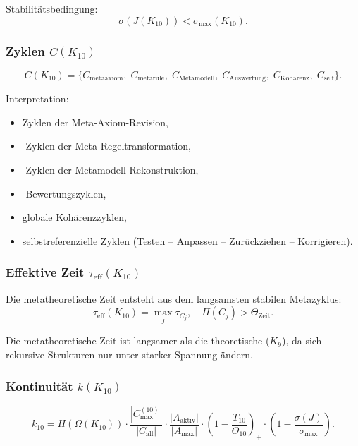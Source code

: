 Stabilitätsbedingung:
\[
\sigma(J(K_{10})) < \sigma_{\max}(K_{10}).
\]

\subsubsection{Zyklen $C(K_{10})$}

\[
C(K_{10})=
\{
C_{\mathrm{metaaxiom}},\;
C_{\mathrm{metarule}},\;
C_{\mathrm{Metamodell}},\;
C_{\mathrm{Auswertung}},\;
C_{\mathrm{Kohärenz}},\;
C_{\mathrm{self}}
\}.
\]

Interpretation:
\begin{itemize}
    \item Zyklen der Meta-Axiom-Revision,
    \item-Zyklen der Meta-Regeltransformation,
    \item-Zyklen der Metamodell-Rekonstruktion,
    \item-Bewertungszyklen,
    \item globale Kohärenzzyklen,
    \item selbstreferenzielle Zyklen (Testen – Anpassen – Zurückziehen – Korrigieren).
\end{itemize}

\subsubsection{Effektive Zeit $\tau_{\mathrm{eff}}(K_{10})$}

Die metatheoretische Zeit entsteht aus dem langsamsten stabilen Metazyklus:
\[
\tau_{\mathrm{eff}}(K_{10}) = \max_j \tau_{C_j},
\quad
\Pi(C_j) > \Theta_{\mathrm{Zeit}}.
\]

Die metatheoretische Zeit ist langsamer als die theoretische ($K_9$), da sich rekursive Strukturen nur unter starker Spannung ändern.

\subsubsection{Kontinuität $k(K_{10})$}

\[
k_{10} =
H(\Omega(K_{10}))
\cdot
\frac{|C_{\max}^{(10)}|}{|C_{\mathrm{all}}|}
\cdot
\frac{|A_{\mathrm{aktiv}}|}{|A_{\max}|}
\cdot
\left(1-\frac{T_{10}}{\Theta_{10}}\right)_+
\cdot
\left(1-\frac{\sigma(J)}{\sigma_{\max}}\right).
\]

